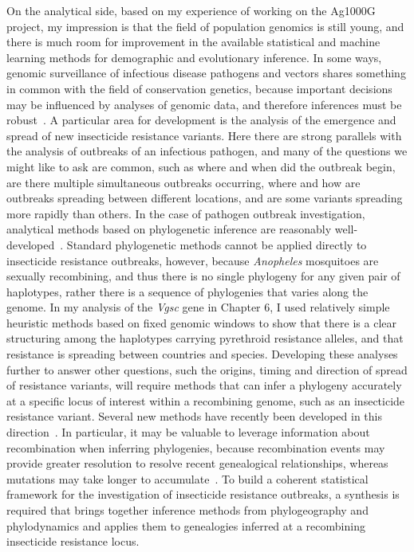 \documentclass[a4paper,11pt,abstracton,hidelinks]{scrartcl}
\begin{document}
On the analytical side, based on my experience of working on the Ag1000G project, my impression is that the field of population genomics is still young, and there is much room for improvement in the available statistical and machine learning methods for demographic and evolutionary inference.
%
In some ways, genomic surveillance of infectious disease pathogens and vectors shares something in common with the field of conservation genetics, because important decisions may be influenced by analyses of genomic data, and therefore inferences must be robust~\parencite{McMahon2014,Supple2018}.
%
A particular area for development is the analysis of the emergence and spread of new insecticide resistance variants.
%
Here there are strong parallels with the analysis of outbreaks of an infectious pathogen, and many of the questions we might like to ask are common, such as where and when did the outbreak begin, are there multiple simultaneous outbreaks occurring, where and how are outbreaks spreading between different locations, and are some variants spreading more rapidly than others.
%
In the case of pathogen outbreak investigation, analytical methods based on phylogenetic inference are reasonably well-developed~\parencite{DeMaio2015,Grubaugh2019}.
%
Standard phylogenetic methods cannot be applied directly to insecticide resistance outbreaks, however, because \textit{Anopheles} mosquitoes are sexually recombining, and thus there is no single phylogeny for any given pair of haplotypes, rather there is a sequence of phylogenies that varies along the genome.
%
In my analysis of the \textit{Vgsc} gene in Chapter 6, I used relatively simple heuristic methods based on fixed genomic windows to show that there is a clear structuring among the haplotypes carrying pyrethroid resistance alleles, and that resistance is spreading between countries and species.
%
Developing these analyses further to answer other questions, such the origins, timing and direction of spread of resistance variants, will require methods that can infer a phylogeny accurately at a specific locus of interest within a recombining genome, such as an insecticide resistance variant.
%
Several new methods have recently been developed in this direction~\parencite{Kelleher2019,Speidel2019}.
%
In particular, it may be valuable to leverage information about recombination when inferring phylogenies, because recombination events may provide greater resolution to resolve recent genealogical relationships, whereas mutations may take longer to accumulate~\parencite{Albers2020,Mathieson2014}.
%
To build a coherent statistical framework for the investigation of insecticide resistance outbreaks, a synthesis is required that brings together inference methods from phylogeography and phylodynamics and applies them to genealogies inferred at a recombining insecticide resistance locus.
\end{document}
